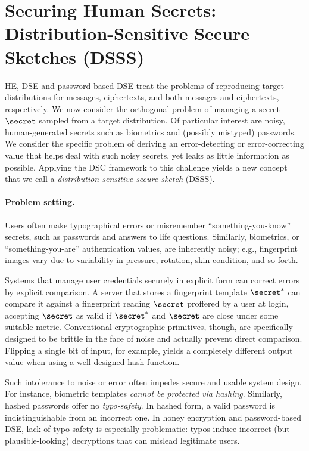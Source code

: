 \section{Securing Human Secrets: Distribution-Sensitive Secure Sketches (DSSS)} 
\label{sec:human}

HE, DSE and password-based DSE treat the problems of reproducing
target distributions for messages, ciphertexts, and both
messages and ciphertexts, respectively.  We now consider the orthogonal problem of managing a
secret $\secret$ sampled from a target distribution. Of particular interest are
noisy, human-generated secrets such as  biometrics and (possibly mistyped) passwords. 
We consider the specific problem of deriving an error-detecting or
error-correcting value that helps deal with such noisy secrets, yet leaks as little
information as possible.
Applying the DSC framework to this challenge yields a new concept that
we call a {\em distribution-sensitive secure sketch} (DSSS). 

\paragraph{Problem setting.} Users often make typographical errors or
misremember ``something-you-know'' secrets, such as passwords and answers to
life questions. Similarly, biometrics, or ``something-you-are'' authentication
values, are inherently noisy; e.g., fingerprint images vary due to variability in pressure,
rotation, skin condition, and so forth.

Systems that manage user credentials securely in explicit form can correct errors
by explicit comparison. A server that stores a fingerprint template $\secret^*$ can
compare it against a fingerprint reading $\secret$ proffered by  a user at login,
accepting $\secret$ as valid if $\secret^*$ and $\secret$ are close under some suitable
metric. Conventional cryptographic primitives, though, are specifically designed
to be brittle in the face of noise and actually prevent direct comparison.
Flipping a single bit of input, for example, yields a completely different
output value when using a well-designed hash function. 

Such intolerance to noise or error often impedes secure and usable system
design. For instance, biometric templates {\em cannot be
protected via hashing}. Similarly, hashed passwords offer no {\em typo-safety}.
In hashed form, a valid password is indistinguishable from an incorrect one. In
honey encryption and password-based DSE, lack of typo-safety is especially
problematic: typos induce incorrect (but plausible-looking) decryptions that can
mislead legitimate users. 

